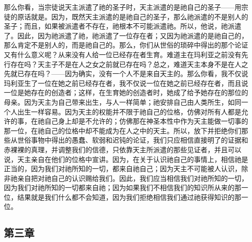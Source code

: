 那么你看，当宗徒说天主派遣了祂的圣子时，天主派遣的是祂自己的圣子——用宗徒的原话就是。因为，既然天主派遣的是祂自己的圣子，那么祂派遣的不是别人的圣子；而且，如果被派遣者不存在，祂根本不可能派遣祂。所以，他说，祂派遣了。因此，因为祂派遣了祂，祂派遣了一位存在者；又因为祂派遣的是祂自己的，那么肯定不是别人的，而是祂自己的。那么，你们从世俗的琐碎中得出的那个论证又有什么意义呢？从来没有人给一位已经存在者生育。难道主在玛利亚之前没有先行存在吗？天主子不是在人之女之前就已存在吗？总之，难道天主本身不是在人之先就已存在吗？——因为确实，没有一个人不是来自天主的。那么你看，我不仅说玛利亚生了一位在她之前已经存在者，我不仅说一位在她之前已经存在者，而且说一位是她存在的创造者；这样，在生育她的创造者时，她成了给予她存在的那位的母亲。因为天主为自己带来出生，与人一样简单；祂安排自己由人类所生，如同一个人出生一样容易。因为天主的权能并不限于祂自己的位格，仿佛对所有人都是允许的事，在祂自己身上却是不允许的；仿佛那在神圣本性中作为天主能做一切事的那一位，在祂自己的位格中却不能成为在人之中的天主。所以，放下并拒绝你们那些从世俗事物中得出的愚蠢、软弱和迟钝的论证，我们只应相信直接明了的证据和赤裸裸的真理，并调整我们的信德，只依靠天主所派遣的那些见证者，并且可以说，天主亲自在他们的位格中宣讲。因为，在关于认识祂自己的事情上，相信祂是正当的，因为我们对祂所知的一切，都来自祂自己；因为天主不可能被人认识，除非祂亲自把对祂自己的认识赐给我们。因此，我们应当相信我们对祂所知的一切，因为我们对祂所知的一切都来自祂；因为如果我们不相信我们的知识所从来的那一位，结果就是我们什么都不会知道，因为我们拒绝相信我们通过祂获得知识的那一位。\par


\subsection{第三章}

\par

